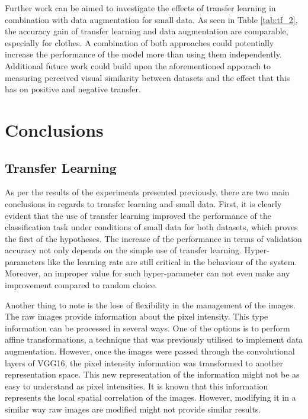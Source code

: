 \documentclass{article}
\begin{document}
Further work can be aimed to investigate the effects of transfer learning in combination with data augmentation for small data. As seen in Table \ref{tab:tf_2}, the accuracy gain of transfer learning and data augmentation are comparable, especially for clothes. A combination of both approaches could potentially increase the performance of the model more than using them independently. Additional future work could build upon the aforementioned apporach to measuring perceived visual similarity between datasets and the effect that this has on positive and negative transfer.

\section{Conclusions}
\label{sec:conclusions}

\subsection{Transfer Learning}

As per the results of the experiments presented previously, there are two main conclusions in regards to transfer learning and small data. First, it is clearly evident that the use of transfer learning improved the performance of the classification task under conditions of small data for both datasets, which proves the first of the hypotheses. The increase of the performance in terms of validation accuracy not only depends on the simple use of transfer learning. Hyper-parameters like the learning rate are still critical in the behaviour of the system. Moreover, an improper value for such hyper-parameter can not even make any improvement compared to random choice. 

Another thing to note is the lose of flexibility in the management of the images. The raw images provide information about the pixel intensity. This type information can be processed in several ways. One of the options is to perform affine transformations, a technique that was previously utilised to implement data augmentation. However, once the images were passed through the convolutional layers of VGG16, the pixel intensity information was transformed to another representation space. This new representation of the information might not be as easy to understand as pixel intensities. It is known that this information represents the local spatial correlation of the images. However, modifying it in a similar way raw images are modified might not provide similar results.
\end{document}
